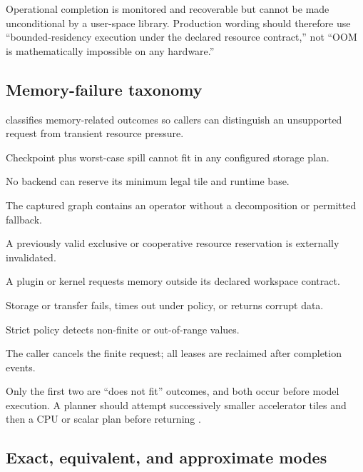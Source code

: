 Operational completion is monitored and recoverable but cannot be made unconditional by a user-space library. Production wording should therefore use ``bounded-residency execution under the declared resource contract,'' not ``OOM is mathematically impossible on any hardware.''

\subsection{Memory-failure taxonomy}

\AMS classifies memory-related outcomes so callers can distinguish an unsupported request from transient resource pressure.

\begin{description}[leftmargin=2.9cm,style=nextline]
  \item[\code{PREFLIGHT\_NO\_BACKING}] Checkpoint plus worst-case spill cannot fit in any configured storage plan.
  \item[\code{PREFLIGHT\_NO\_WORKING\_SET}] No backend can reserve its minimum legal tile and runtime base.
  \item[\code{UNSUPPORTED\_OP}] The captured graph contains an operator without a decomposition or permitted fallback.
  \item[\code{RESERVATION\_LOST}] A previously valid exclusive or cooperative resource reservation is externally invalidated.
  \item[\code{BROKER\_VIOLATION}] A plugin or kernel requests memory outside its declared workspace contract.
  \item[\code{IO\_FAILURE}] Storage or transfer fails, times out under policy, or returns corrupt data.
  \item[\code{NUMERIC\_FAILURE}] Strict policy detects non-finite or out-of-range values.
  \item[\code{CANCELLED}] The caller cancels the finite request; all leases are reclaimed after completion events.
\end{description}

Only the first two are ``does not fit'' outcomes, and both occur before model execution. A planner should attempt successively smaller accelerator tiles and then a CPU or scalar plan before returning .

\subsection{Exact, equivalent, and approximate modes}

